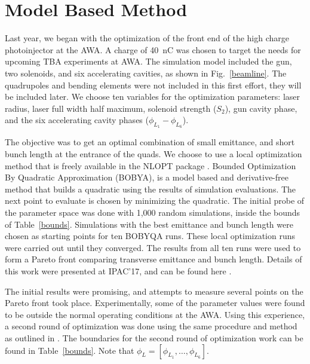 \documentclass[letterpaper,  %
              ]{jacow-2_3}   %
\begin{document}
\section{Model Based Method}
Last year, we began with the optimization of the front end of 
the high charge photoinjector at the AWA. A charge
of \SI{40}{nC} was chosen to target the needs 
for upcoming TBA experiments at AWA.
The simulation model included the gun, two solenoids, 
and six accelerating cavities, as shown in Fig.~\ref{beamline}. 
The quadrupoles and bending elements were not included in this first effort, they will be included later.
We choose ten variables for the optimization parameters: 
laser radius, laser full width half maximum, solenoid strength ($S_2$), 
gun cavity phase, and the six accelerating cavity phases ($\phi_{L_1}-\phi_{L_6}$).
\begin{figure*}
	\centering
	\begin{tikzpicture}[scale=0.7, text=black]
	
	\end{tikzpicture}	
	\caption{Partial beam line layout at the AWA.}
	\label{beamline}
\end{figure*}

The objective was to get an optimal combination of small emittance, and short bunch length at the 
entrance of the quads. 
We choose to use a local optimization method that is 
freely available in the NLOPT package \cite{nlopt}. 
Bounded Optimization By Quadratic Approximation (BOBYA), 
is a model based and derivative-free method 
that builds a quadratic using the results of simulation evaluations. 
The next point to evaluate is chosen by minimizing the quadratic.
The initial probe of the parameter space was done with 1,000 random simulations, 
inside the bounds of Table~\ref{bounds}.
Simulations with the best emittance and bunch length were chosen 
as starting points for ten BOBYQA runs.
These local optimization runs were carried out until they converged.
The results from all ten runs were used to form a Pareto front
comparing transverse emittance and bunch length. 
Details of this work were presented at IPAC'17, and can be found here \cite{denmark}. 

The initial results were promising, and attempts to measure
several points on the Pareto front took place.
Experimentally, some of the parameter values were found to 
be outside the normal operating conditions at the AWA.
Using this experience, a second round of optimization 
was done using the same procedure and method as 
outlined in \cite{denmark}. The boundaries for the second
round of optimization work can be found in Table~\ref{bounds}.
Note that $\phi_L=[\phi_{L_1},\ldots,\phi_{L_6}]$.
\end{document}
